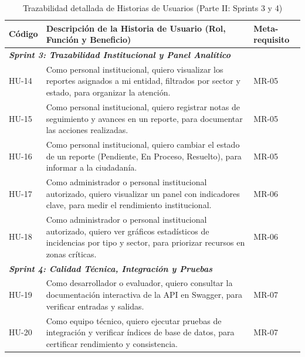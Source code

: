 \begin{table}[!htbp]
	\centering
	\caption{Trazabilidad detallada de Historias de Usuarios (Parte II: Sprints 3 y 4)}
	\label{tab:inventario_hu_parte2}
	\begin{tabularx}{\textwidth}{p{1.2cm} X p{2.5cm}}
		\toprule
		\textbf{Código} & \textbf{Descripción de la Historia de Usuario (Rol, Función y Beneficio)} & \textbf{Meta-requisito} \\ 
		\midrule
		\multicolumn{3}{l}{\textit{\textbf{Sprint 3: Trazabilidad Institucional y Panel Analítico}}} \\ 
		\addlinespace
		HU-14 & Como personal institucional, quiero visualizar los reportes asignados a mi entidad, filtrados por sector y estado, para organizar la atención. & MR-05 \\ \addlinespace
		HU-15 & Como personal institucional, quiero registrar notas de seguimiento y avances en un reporte, para documentar las acciones realizadas. & MR-05 \\ \addlinespace
		HU-16 & Como personal institucional, quiero cambiar el estado de un reporte (Pendiente, En Proceso, Resuelto), para informar a la ciudadanía. & MR-05 \\ \addlinespace
		HU-17 & Como administrador o personal institucional autorizado, quiero visualizar un panel con indicadores clave, para medir el rendimiento institucional. & MR-06 \\ \addlinespace
		HU-18 & Como administrador o personal institucional autorizado, quiero ver gráficos estadísticos de incidencias por tipo y sector, para priorizar recursos en zonas críticas. & MR-06 \\ 
		\midrule
		\multicolumn{3}{l}{\textit{\textbf{Sprint 4: Calidad Técnica, Integración y Pruebas}}} \\ 
		\addlinespace
		HU-19 & Como desarrollador o evaluador, quiero consultar la documentación interactiva de la API en Swagger, para verificar entradas y salidas. & MR-07 \\ \addlinespace
		HU-20 & Como equipo técnico, quiero ejecutar pruebas de integración y verificar índices de base de datos, para certificar rendimiento y consistencia. & MR-07 \\ 
		\bottomrule
	\end{tabularx}
\end{table}


\newpage

